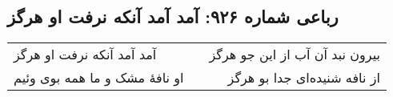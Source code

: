 \begin{center}
\section*{رباعی شماره ۹۲۶: آمد آمد آنکه نرفت او هرگز}
\label{sec:0926}
\begin{longtable}{l p{0.5cm} r}
آمد آمد آنکه نرفت او هرگز
&&
بیرون نبد آن آب از این جو هرگز
\\
او نافهٔ مشک و ما همه بوی وئیم
&&
از نافه شنیده‌ای جدا بو هرگز
\\
\end{longtable}
\end{center}
